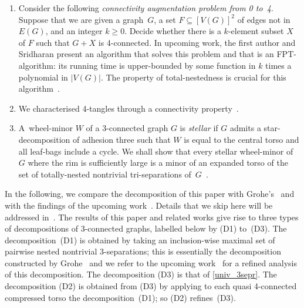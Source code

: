 \documentclass{aic}
\newcommand{\jaf}[3]{#2} %
\newcommand{\se}{\subseteq}
\theoremstyle{plain}
\theoremstyle{definition}
\theoremstyle{plain}
\theoremstyle{plain}
\renewcommand{\ge}{\geqslant}
\begin{document}
\begin{enumerate}
    \item Consider the following \emph{connectivity augmentation problem from 0 to~4}.
    Suppose that we are given a graph~$G$, a set $F\se [V(G)]^2$ of edges not in~$E(G)$, and an integer $k\ge 0$.
    Decide whether there is a $k$-element subset $X$ of $F$ such that $G+X$ is 4-connected.
    In upcoming work, the first author and Sridharan present an algorithm that solves this problem and that is an FPT-algorithm: its running time is upper-bounded by some function in $k$ times a polynomial in $|V(G)|$. 
    The property of total-nestedness is crucial for this algorithm\jaf{~\cite{conny_aug}}{~\cite{conny_aug}}{}.
    \item We characterised 4-tangles through a connectivity property\jaf{~\cite{greedy_grohe}}{~\cite{greedy_grohe}}{}.
    \item A~wheel-minor $W$ of a 3-connected graph $G$ is \emph{stellar} if $G$ admits a star-decomposition of adhesion three such that $W$ is equal to the central torso and all leaf-bags include a cycle. 
    We shall show that every stellar wheel-minor of $G$ where the rim is sufficiently large is a minor of an expanded torso of the set of totally-nested nontrivial tri-separations of~$G$\jaf{~\cite{stellar_wheel}}{~\cite{stellar_wheel}}{}.
\end{enumerate}

In the following, we compare the decomposition of this paper with Grohe's~\cite{grohe2016quasi} and with the findings of the upcoming work\jaf{~\cite{greedy_grohe,stellar_wheel}}{~\cite{greedy_grohe,stellar_wheel}}{ [references removed for anonymisation, also in the following]}.
Details that we skip here will be addressed in\jaf{~\cite{greedy_grohe,stellar_wheel}}{~\cite{greedy_grohe,stellar_wheel}}{ the upcoming work}.
The results of this paper and related works give rise to three types of decompositions of 3-connected graphs, labelled below by (D1) to~(D3).
The decomposition~(D1) is obtained by taking an inclusion-wise maximal set of pairwise nested nontrivial 3-separations; this is essentially the decomposition constructed by Grohe~\cite{grohe2016quasi} and we refer to the upcoming work\jaf{~\cite{greedy_grohe}}{~\cite{greedy_grohe}}{} for a refined analysis of this decomposition.
The decomposition (D3) is that of \autoref{univ_3sepr}.
The decomposition (D2) is obtained from (D3) by applying to each quasi 4-connected compressed torso the decomposition~(D1); so (D2) refines~(D3).
\end{document}
